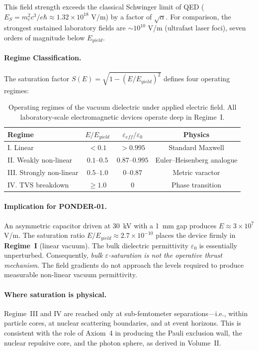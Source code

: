 This field strength exceeds the classical Schwinger limit of QED ($E_S = m_e^2 c^3 / e\hbar \approx 1.32 \times 10^{18}$ V/m) by a factor of $\sqrt{\alpha}$. For comparison, the strongest sustained laboratory fields are $\sim 10^{10}$ V/m (ultrafast laser foci), seven orders of magnitude below $E_{yield}$.

\paragraph{Regime Classification.} The saturation factor $S(E) = \sqrt{1 - (E/E_{yield})^2}$ defines four operating regimes:

\begin{table}[H]
\centering
\caption{Operating regimes of the vacuum dielectric under applied electric field. All laboratory-scale electromagnetic devices operate deep in Regime~I.}
\label{tab:ponder_regimes}
\small
\begin{tabular}{@{}l c c c@{}}
\toprule
\textbf{Regime} & $E / E_{yield}$ & $\varepsilon_{eff} / \varepsilon_0$ & \textbf{Physics} \\
\midrule
I. Linear                & $< 0.1$     & $> 0.995$   & Standard Maxwell \\
II. Weakly non-linear    & $0.1$--$0.5$ & $0.87$--$0.995$ & Euler--Heisenberg analogue \\
III. Strongly non-linear & $0.5$--$1.0$ & $0$--$0.87$     & Metric varactor \\
IV. TVS breakdown        & $\geq 1.0$  & $0$             & Phase transition \\
\bottomrule
\end{tabular}
\end{table}

\paragraph{Implication for PONDER-01.} An asymmetric capacitor driven at 30~kV with a 1~mm gap produces $E \approx 3 \times 10^7$ V/m. The saturation ratio $E/E_{yield} \approx 2.7 \times 10^{-10}$ places the device firmly in \textbf{Regime~I} (linear vacuum). The bulk dielectric permittivity $\varepsilon_0$ is essentially unperturbed. Consequently, \textit{bulk $\varepsilon$-saturation is not the operative thrust mechanism}. The field gradients do not approach the levels required to produce measurable non-linear vacuum permittivity.

\paragraph{Where saturation is physical.} Regime~III and IV are reached only at sub-femtometer separations---i.e., within particle cores, at nuclear scattering boundaries, and at event horizons. This is consistent with the role of Axiom~4 in producing the Pauli exclusion wall, the nuclear repulsive core, and the photon sphere, as derived in Volume~II.

